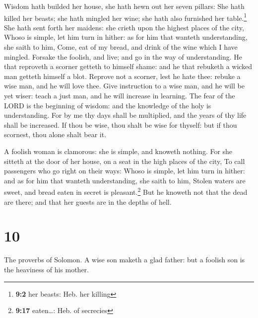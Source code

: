  Wisdom hath builded her house, she hath hewn out her
seven pillars:  She hath killed her beasts; she hath
mingled her wine; she hath also furnished her table.\footnote{\textbf{9:2}
  her beasts: Heb. her killing}  She hath sent forth her
maidens: she crieth upon the highest places of the city, 
Whoso is simple, let him turn in hither: as for him that wanteth
understanding, she saith to him,  Come, eat of my bread,
and drink of the wine which I have mingled.  Forsake the
foolish, and live; and go in the way of understanding.  He
that reproveth a scorner getteth to himself shame: and he that rebuketh
a wicked man getteth himself a blot.  Reprove not a
scorner, lest he hate thee: rebuke a wise man, and he will love thee.
 Give instruction to a wise man, and he will be yet wiser:
teach a just man, and he will increase in learning.  The
fear of the LORD is the beginning of wisdom: and the knowledge of the
holy is understanding.  For by me thy days shall be
multiplied, and the years of thy life shall be increased.
 If thou be wise, thou shalt be wise for thyself: but if
thou scornest, thou alone shalt bear it.

 A foolish woman is clamorous: she is simple, and knoweth
nothing.  For she sitteth at the door of her house, on a
seat in the high places of the city,  To call passengers
who go right on their ways:  Whoso is simple, let him
turn in hither: and as for him that wanteth understanding, she saith to
him,  Stolen waters are sweet, and bread eaten in secret
is pleasant.\footnote{\textbf{9:17} eaten\ldots: Heb. of secrecies}
 But he knoweth not that the dead are there; and that her
guests are in the depths of hell.

\hypertarget{section-9}{%
\section{10}\label{section-9}}

 The proverbs of Solomon. A wise son maketh a glad father:
but a foolish son is the heaviness of his mother.

